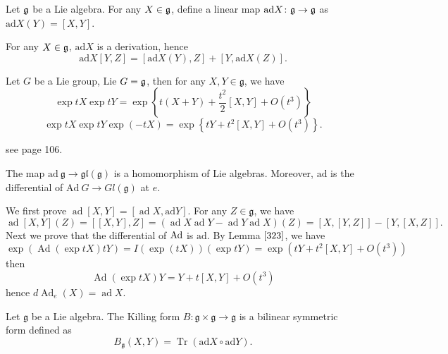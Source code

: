 \begin{definition}
	Let ${\mathfrak g}$ be a Lie algebra. For any $X \in {\mathfrak g}$, define a
	linear map $\mathrm{ad}X\colon{\mathfrak g} \to {\mathfrak g}$ as
	$\mathrm{ad}X(Y)=[X,Y]$.
\end{definition}
\begin{theorem}
	For any $X\in{\mathfrak g}$, $\mathrm{ad}X$ is a derivation,
	hence$$\mathrm{ad}X[Y,Z] =
	[\mathrm{ad}X(Y),Z]+[Y,\mathrm{ad}X(Z)].$$
\end{theorem}
\begin{lemma}\label{323}
Let $G$ be a Lie group,  Lie $G={\mathfrak g}$, then for any $X, Y \in
\mathfrak{g}$, we have
\[
	\exp t X \exp t Y = \exp \left\{ t(X+Y)+\frac{t^{2}}{2}[X,
	Y]+O\left(t^{3}\right) \right\}
\]
\[
	\exp t X \exp t Y \exp (-t X) = \exp \left\{ t Y+t^{2}[X,
	Y]+O\left( t^{3} \right) \right\}.
\]	
\end{lemma}
\bproof
see \cite{Hel} page 106.
\eproof

\begin{theorem}
	The map  $\mathrm{ad}\:\mathfrak{g} \rightarrow
	\mathfrak{gl}(\mathfrak{g})$ is a homomorphism of Lie
	algebras. Moreover,  $\mathrm{ad}$ is the differential of
	$\mathrm{Ad}\: {G} \rightarrow {Gl}(\mathfrak{g})$ at $e .$

\end{theorem}
\bproof
We first prove $\operatorname{ad}[X, Y]=[\operatorname{ad} X, 
\mathrm{ad} Y]$.  For any $Z \in \mathfrak{g}$, we have
$$\operatorname{ad}[X, Y](Z)=[[X, Y], Z]=(\operatorname{ad} X
\operatorname{ad} Y-\operatorname{ad} Y \operatorname{ad}
X)(Z)=[X,[Y, Z]]-[Y,[X,Z]].$$
Next we prove that the differential of $\mathrm{Ad}$ is $\mathrm{ad}$. By
Lemma $\ref{323}$, we
have  $$\exp (\operatorname{Ad}(\exp t X) t Y) = I(\exp (t
X))(\exp t Y) = \exp \left( t Y+t^{2}[X, Y]+O\left( t^{3} \right)
\right)$$
then 
$$
\operatorname{Ad}(\exp t X) Y=Y+t[X, Y]+O\left( t^{3} \right)
$$
hence $d \operatorname{Ad}_{e}(X)=\operatorname{ad} X$.
\eproof
\begin{definition}
Let $\mathfrak{g}$ be a Lie algebra. The Killing form $B:
\mathfrak{g} \times \mathfrak{g} \rightarrow \mathfrak{g}$ is a
bilinear symmetric form defined as
\[
B_{\mathfrak{g}}(X, Y)=\operatorname{Tr}(\mathrm{ad} {X} \circ
\mathrm{ad} {Y}).
\]	
\end{definition}


